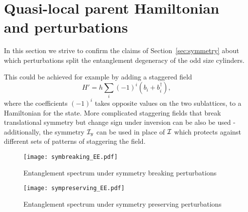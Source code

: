 
\section{Quasi-local parent Hamiltonian and perturbations}
\label{sec:perturbations}

In this section we strive to confirm the claims of Section~\ref{sec:symmetry} about
which perturbations split the entanglement degeneracy of the odd size cylinders.

This could be achieved for example by adding a staggered field 
$$
H' = h \sum\limits_{i} (-1)^i \left(b_i + b_i^{\dagger}\right),
$$
where the coefficients $(-1)^i$ takes opposite values on the two sublattices, 
to a Hamiltonian for the state. More complicated staggering fields that break translational 
symmetry but change sign under inversion can be also be used - additionally, the symmetry $\mathcal{I}_y$ 
can be used in place of $\mathcal{I}$ which protects against different sets of patterns of staggering the 
field.

\begin{figure}[htbp]
	\centering
		\texttt{[image: symbreaking\_EE.pdf]}
	\caption{Entanglement spectrum under symmetry breaking perturbations}
	\label{fig:symbreaking_EE}
\end{figure}

\begin{figure}[htbp]
	\centering
		\texttt{[image: sympreserving\_EE.pdf]}
	\caption{Entanglement spectrum under symmetry preserving perturbations}
	\label{fig:sympreserving_EE}
\end{figure}


